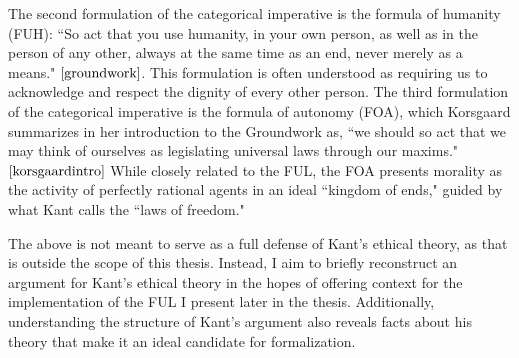 \begin{isabellebody}
\begin{isamarkuptext}
The second formulation of the categorical imperative is the formula of humanity (FUH): ``So act that you use humanity, 
in your own person, as well as in the person of any other, always at the same time as an end, never merely 
as a means." $\cite[41]{groundwork}$. This formulation is often understood as requiring us to 
acknowledge and respect the dignity of every other person. The third formulation of the categorical 
imperative is the formula of autonomy (FOA), which Korsgaard summarizes in her introduction to the Groundwork 
as, ``we should so act that we may think of ourselves as legislating universal laws through our 
maxims." $\cite[28]{korsgaardintro}$ While closely related to the FUL, the FOA presents morality as the activity of 
perfectly rational agents in an ideal ``kingdom of ends," guided by what Kant calls the ``laws of freedom."

The above is not meant to serve as a full defense of Kant's ethical theory, as that is outside the scope
of this thesis. Instead, I aim to briefly reconstruct an argument for Kant's ethical theory in the hopes 
of offering context for the implementation of the FUL I present later in the thesis. Additionally, understanding 
the structure of Kant's argument also reveals facts about his theory that make it an ideal candidate 
for formalization.


\end{isamarkuptext}
\end{isabellebody}
